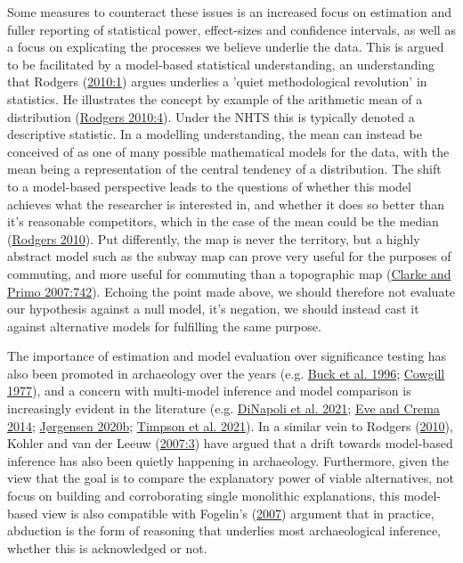 \documentclass[
  12pt,
  a4paper,
  oneside]{book}
\begin{document}
Some measures to counteract these issues is an increased focus on estimation and fuller reporting of statistical power, effect-sizes and confidence intervals, as well as a focus on explicating the processes we believe underlie the data. This is argued to be facilitated by a model-based statistical understanding, an understanding that Rodgers (\protect\hyperlink{ref-rodgers2010}{2010:1}) argues underlies a 'quiet methodological revolution' in statistics. He illustrates the concept by example of the arithmetic mean of a distribution (\protect\hyperlink{ref-rodgers2010}{Rodgers 2010:4}). Under the NHTS this is typically denoted a descriptive statistic. In a modelling understanding, the mean can instead be conceived of as one of many possible mathematical models for the data, with the mean being a representation of the central tendency of a distribution. The shift to a model-based perspective leads to the questions of whether this model achieves what the researcher is interested in, and whether it does so better than it's reasonable competitors, which in the case of the mean could be the median (\protect\hyperlink{ref-rodgers2010}{Rodgers 2010}). Put differently, the map is never the territory, but a highly abstract model such as the subway map can prove very useful for the purposes of commuting, and more useful for commuting than a topographic map (\protect\hyperlink{ref-clarke2007}{Clarke and Primo 2007:742}). Echoing the point made above, we should therefore not evaluate our hypothesis against a null model, it's negation, we should instead cast it against alternative models for fulfilling the same purpose.

The importance of estimation and model evaluation over significance testing has also been promoted in archaeology over the years (e.g. \protect\hyperlink{ref-buck1996}{Buck et al. 1996}; \protect\hyperlink{ref-cowgill1977}{Cowgill 1977}), and a concern with multi-model inference and model comparison is increasingly evident in the literature (e.g. \protect\hyperlink{ref-dinapoli2021}{DiNapoli et al. 2021}; \protect\hyperlink{ref-eve2014}{Eve and Crema 2014}; \protect\hyperlink{ref-jorgensen2020c}{Jørgensen 2020b}; \protect\hyperlink{ref-timpson2021}{Timpson et al. 2021}). In a similar vein to Rodgers (\protect\hyperlink{ref-rodgers2010}{2010}), Kohler and van der Leeuw (\protect\hyperlink{ref-kohler2007}{2007:3}) have argued that a drift towards model-based inference has also been quietly happening in archaeology. Furthermore, given the view that the goal is to compare the explanatory power of viable alternatives, not focus on building and corroborating single monolithic explanations, this model-based view is also compatible with Fogelin's (\protect\hyperlink{ref-fogelin2007}{2007}) argument that in practice, abduction is the form of reasoning that underlies most archaeological inference, whether this is acknowledged or not.
\end{document}
